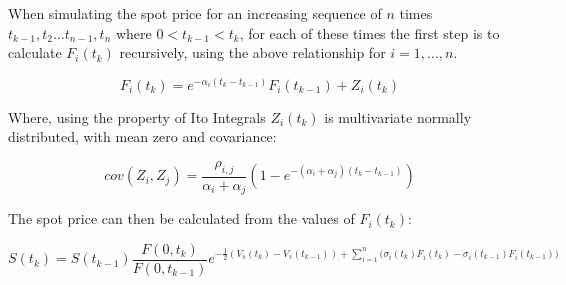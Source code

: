 \documentclass{article}
\begin{document}
\bigskip

When simulating the spot price for an increasing sequence of $n$
times $t_{k-1}, t_2 \hdots t_{n-1}, t_n$ where $0 < t_{k-1} < t_k$, for each of these
times the first step is to calculate $F_i(t_k)$ recursively, using the above relationship %
for $i = 1, \hdots, n$.

\begin{equation}
    F_i(t_k) = e^{-\alpha_i(t_k - t_{k-1})}F_i(t_{k-1}) + Z_i(t_k)
\end{equation}

Where, using the property of Ito Integrals $Z_i(t_k)$ is multivariate normally 
distributed, with mean zero and covariance:

\begin{equation}
    cov(Z_i, Z_j) = \frac{\rho_{i, j}}{\alpha_i + \alpha_j}(1 - 
    e^{-(\alpha_i + \alpha_j)(t_k - t_{k-1})})
\end{equation}

The spot price can then be calculated from the values of $F_i(t_k)$:

\begin{equation}
    S(t_k) = S(t_{k-1}) \frac{F(0, t_k)}{F(0, t_{k-1})} e^{- \frac{1}{2} (V_s(t_k) - 
    V_s(t_{k-1})) + \sum_{i=1}^n \bigl(\sigma_i(t_k)F_i(t_k) - \sigma_i(t_{k-1})F_i(t_{k-1})\bigr)}
\end{equation}


\end{document}
